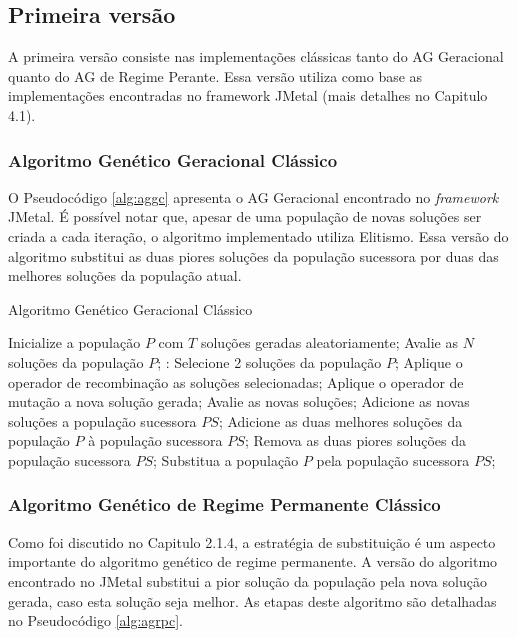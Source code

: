 \subsection{Primeira versão}
\label{ch:3_PrimeiraVersao}
A primeira versão consiste nas implementações clássicas tanto do AG Geracional quanto do AG de Regime Perante. Essa versão utiliza como base as implementações encontradas no framework JMetal (mais detalhes no Capitulo 4.1).

\subsubsection{Algoritmo Genético Geracional Clássico}
\label{ch:3_AlgoritmoGeneticoGeracionalClassico}
O Pseudocódigo \ref{alg:aggc} apresenta o AG Geracional encontrado no \textit{framework} JMetal. É possível notar que, apesar de uma população de novas soluções ser criada a cada iteração, o algoritmo implementado utiliza Elitismo. Essa versão do algoritmo substitui as duas piores soluções da população sucessora por duas das melhores soluções da população atual.

\begin{algorithm}
  \caption{Algoritmo Genético Geracional Clássico}
  \label{alg:aggc}
  \begin{algorithmic}
    \State Inicialize a população $P$ com $T$ soluções geradas aleatoriamente;
    \State Avalie as $N$ soluções da população $P$;
       \State:
        \State Selecione 2 soluções da população $P$;
        \State Aplique o operador de recombinação as soluções selecionadas;
        \State Aplique o operador de mutação a nova solução gerada;
        \State Avalie as novas soluções;
        \State Adicione as novas soluções a população sucessora $PS$;
      \EndFor
      \State Adicione as duas melhores soluções da população $P$ à população sucessora $PS$;
      \State Remova as duas piores soluções da população sucessora $PS$;
      \State Substitua a população $P$ pela população sucessora $PS$;
    \EndWhile
  \end{algorithmic}
\end{algorithm}

\subsubsection{Algoritmo Genético de Regime Permanente Clássico}
\label{ch:3_AlgoritmoGeneticoRegimePermanente}
Como foi discutido no Capitulo 2.1.4, a estratégia de substituição é um aspecto importante do algoritmo genético de regime permanente. A versão do algoritmo encontrado no JMetal substitui a pior solução da população pela nova solução gerada, caso esta solução seja melhor. As etapas deste algoritmo são detalhadas no Pseudocódigo \ref{alg:agrpc}.

